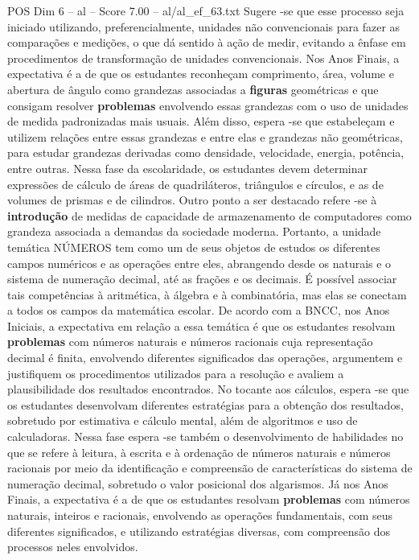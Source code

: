 \begin{textsample}{POS Dim 6 – al – Score 7.00 – al/al\_ef\_63.txt}
Sugere -se que esse processo seja iniciado utilizando, preferencialmente, unidades não convencionais para fazer as comparações e medições, o que dá sentido à ação de medir, evitando a ênfase em procedimentos de transformação de unidades convencionais.
Nos Anos Finais, a expectativa é a de que os estudantes reconheçam comprimento, área, volume e abertura de ângulo como grandezas associadas a \textbf{figuras} geométricas e que consigam resolver \textbf{problemas} envolvendo essas grandezas com o uso de unidades de medida padronizadas mais usuais.
Além disso, espera -se que estabeleçam e utilizem relações entre essas grandezas e entre elas e grandezas não geométricas, para estudar grandezas derivadas como densidade, velocidade, energia, potência, entre outras.
Nessa fase da escolaridade, os estudantes devem determinar expressões de cálculo de áreas de quadriláteros, triângulos e círculos, e as de volumes de prismas e de cilindros.
Outro ponto a ser destacado refere -se à \textbf{introdução} de medidas de capacidade de armazenamento de computadores como grandeza associada a demandas da sociedade moderna.
Portanto, a unidade temática NÚMEROS tem como um de seus objetos de estudos os diferentes campos numéricos e as operações entre eles, abrangendo desde os naturais e o sistema de numeração decimal, até as frações e os decimais.
É possível associar tais competências à aritmética, à álgebra e à combinatória, mas elas se conectam a todos os campos da matemática escolar.
De acordo com a BNCC, nos Anos Iniciais, a expectativa em relação a essa temática é que os estudantes resolvam \textbf{problemas} com números naturais e números racionais cuja representação decimal é finita, envolvendo diferentes significados das operações, argumentem e justifiquem os procedimentos utilizados para a resolução e avaliem a plausibilidade dos resultados encontrados.
No tocante aos cálculos, espera -se que os estudantes desenvolvam diferentes estratégias para a obtenção dos resultados, sobretudo por estimativa e cálculo mental, além de algoritmos e uso de calculadoras.
Nessa fase espera -se também o desenvolvimento de habilidades no que se refere à leitura, à escrita e à ordenação de números naturais e números racionais por meio da identificação e compreensão de características do sistema de numeração decimal, sobretudo o valor posicional dos algarismos.
Já nos Anos Finais, a expectativa é a de que os estudantes resolvam \textbf{problemas} com números naturais, inteiros e racionais, envolvendo as operações fundamentais, com seus diferentes significados, e utilizando estratégias diversas, com compreensão dos processos neles envolvidos.

\end{textsample}
